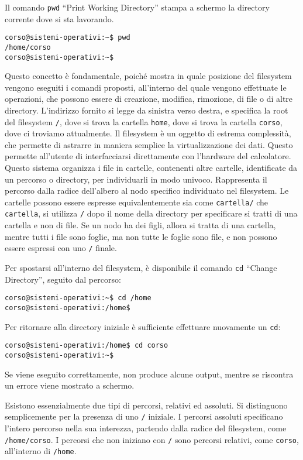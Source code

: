 \documentclass{article}
\numberwithin{equation}{subsection}
\begin{document}
Il comando \verb|pwd| ``Print Working Directory'' stampa a schermo la directory corrente dove si sta lavorando. 
\begin{verbatim}
corso@sistemi-operativi:~$ pwd
/home/corso
corso@sistemi-operativi:~$    
\end{verbatim}

Questo concetto è fondamentale, poiché mostra in quale posizione del filesystem vengono eseguiti i comandi proposti, all'interno del quale vengono effettuate le operazioni, che possono essere di creazione, modifica, 
rimozione, di file o di altre directory. 
L'indirizzo fornito si legge da sinistra verso destra, e specifica la root del filesystem \verb|/|, dove si trova la cartella \verb|home|, dove si trova la cartella \verb|corso|, dove ci troviamo attualmente. 
Il filesystem è un oggetto di estrema complessità, che permette di astrarre in maniera semplice la virtualizzazione dei dati. Questo permette all'utente di interfacciarsi direttamente con l'hardware del calcolatore. 
Questo sistema organizza i file in cartelle, contenenti altre cartelle, identificate da un percorso o directory, per individuarli in modo univoco. Rappresenta il percorso dalla radice dell'albero al nodo specifico 
individuato nel filesystem. Le cartelle possono essere espresse equivalentemente sia come \verb|cartella/| che \verb|cartella|, si utilizza \verb|/| dopo il nome della directory per specificare si tratti di una 
cartella e non di file. Se un nodo ha dei figli, allora si tratta di una cartella, mentre tutti i file sono foglie, ma non tutte le foglie sono file, e non possono essere espressi con uno \verb|/| finale. 


Per spostarsi all'interno del filesystem, è disponibile il comando \verb|cd| ``Change Directory'', seguito dal percorso:
\begin{verbatim}
corso@sistemi-operativi:~$ cd /home
corso@sistemi-operativi:/home$
\end{verbatim}
Per ritornare alla directory iniziale è sufficiente effettuare nuovamente un \verb|cd|:
\begin{verbatim}
corso@sistemi-operativi:/home$ cd corso
corso@sistemi-operativi:~$
\end{verbatim}
    
Se viene eseguito correttamente, non produce alcune output, mentre se riscontra un errore viene mostrato a schermo. 


Esistono essenzialmente due tipi di percorsi, relativi ed assoluti. Si distinguono semplicemente per la presenza di uno \verb|/| iniziale. I percorsi assoluti specificano l'intero percorso nella sua interezza, 
partendo dalla radice del filesystem, come \verb|/home/corso|. I percorsi che non iniziano con \verb|/| sono percorsi relativi, come \verb|corso|, all'interno di \verb|/home|. 
\end{document}
